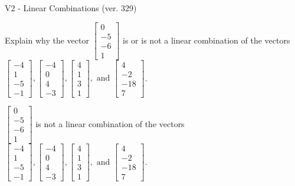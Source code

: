 \begin{exercise}
  \begin{exerciseTitle}V2 - Linear Combinations (ver. 329)\end{exerciseTitle}
  \begin{exerciseStatement}
    Explain why the vector \(\left[\begin{array}{c}
0 \\
-5 \\
-6 \\
1
\end{array}\right]\)  is or is not a linear 
	combination of the vectors \(\left[\begin{array}{c}
-4 \\
1 \\
-5 \\
-1
\end{array}\right] , \left[\begin{array}{c}
-4 \\
0 \\
4 \\
-3
\end{array}\right] , \left[\begin{array}{c}
4 \\
1 \\
3 \\
1
\end{array}\right] , \text{ and } \left[\begin{array}{c}
4 \\
-2 \\
-18 \\
7
\end{array}\right]\).
	


  \end{exerciseStatement}
  \begin{exerciseAnswer}
   \(\left[\begin{array}{c}
0 \\
-5 \\
-6 \\
1
\end{array}\right]\) 
  	 is not  
	a linear combination of the vectors \(\left[\begin{array}{c}
-4 \\
1 \\
-5 \\
-1
\end{array}\right] , \left[\begin{array}{c}
-4 \\
0 \\
4 \\
-3
\end{array}\right] , \left[\begin{array}{c}
4 \\
1 \\
3 \\
1
\end{array}\right] , \text{ and } \left[\begin{array}{c}
4 \\
-2 \\
-18 \\
7
\end{array}\right]\).


\end{exerciseAnswer}
\end{exercise}
